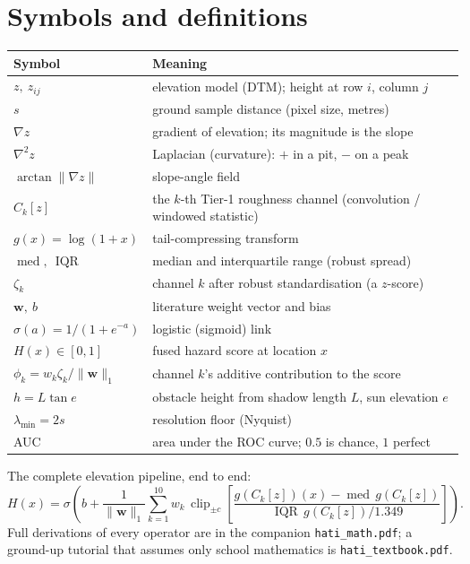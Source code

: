 \documentclass[11pt]{article}
\begin{document}
\section{Symbols and definitions}
\small
\begin{tabular}{@{}ll@{}}
\toprule
Symbol & Meaning \\
\midrule
$z,\ z_{ij}$ & elevation model (DTM); height at row $i$, column $j$ \\
$s$ & ground sample distance (pixel size, metres) \\
$\nabla z$ & gradient of elevation; its magnitude is the slope \\
$\nabla^2 z$ & Laplacian (curvature): $+$ in a pit, $-$ on a peak \\
$\arctan\lVert\nabla z\rVert$ & slope-angle field \\
$C_k[z]$ & the $k$-th Tier-1 roughness channel (convolution / windowed statistic) \\
$g(x)=\log(1+x)$ & tail-compressing transform \\
$\operatorname{med},\ \operatorname{IQR}$ & median and interquartile range (robust spread) \\
$\zeta_k$ & channel $k$ after robust standardisation (a $z$-score) \\
$\mathbf{w},\ b$ & literature weight vector and bias \\
$\sigma(a)=1/(1+e^{-a})$ & logistic (sigmoid) link \\
$H(x)\in[0,1]$ & fused hazard score at location $x$ \\
$\phi_k=w_k\zeta_k/\lVert\mathbf{w}\rVert_1$ & channel $k$'s additive contribution to the score \\
$h=L\tan e$ & obstacle height from shadow length $L$, sun elevation $e$ \\
$\lambda_{\min}=2s$ & resolution floor (Nyquist) \\
AUC & area under the ROC curve; $0.5$ is chance, $1$ perfect \\
\bottomrule
\end{tabular}

\medskip\noindent
The complete elevation pipeline, end to end:
\[
H(x)=\sigma\!\left(b+\frac{1}{\lVert\mathbf{w}\rVert_1}\sum_{k=1}^{10} w_k\,
\operatorname{clip}_{\pm c}\!\left[\frac{g(C_k[z])(x)-\operatorname{med}\,g(C_k[z])}{\operatorname{IQR}\,g(C_k[z])/1.349}\right]\right).
\]
Full derivations of every operator are in the companion \texttt{hati\_math.pdf}; a
ground-up tutorial that assumes only school mathematics is \texttt{hati\_textbook.pdf}.

\printbibliography[heading=bibintoc,title={References}]
\end{document}
